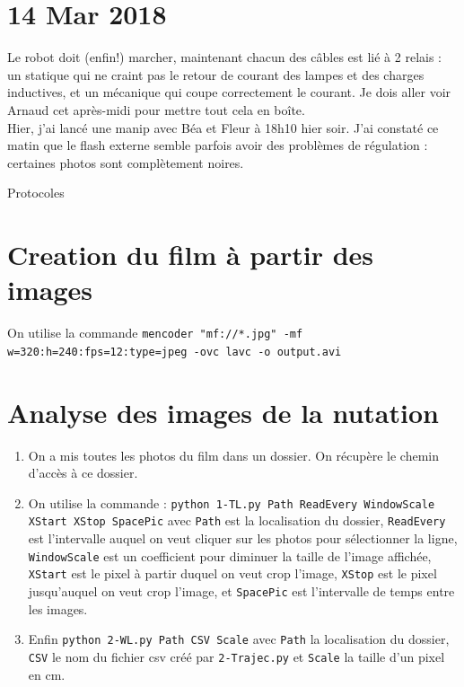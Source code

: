 \documentclass[10pt,a4paper]{article}
\begin{document}
\section{14 Mar 2018}
Le robot doit (enfin!) marcher, maintenant chacun des câbles est lié à 2 relais : un statique qui ne craint pas le retour de courant des lampes et des charges inductives, et un mécanique qui coupe correctement le courant. Je dois aller voir Arnaud cet après-midi pour mettre tout cela en boîte.\\

Hier, j'ai lancé une manip avec Béa et Fleur à 18h10 hier soir. J'ai constaté ce matin que le flash externe semble parfois avoir des problèmes de régulation : certaines photos sont complètement noires.


\newpage
\begin{center}
    {\Huge Protocoles}
\end{center}
\appendix
\setcounter{secnumdepth}{1}

\section{Creation du film à partir des images\label{film}}
On utilise la commande \texttt{mencoder "mf://*.jpg" -mf w=320:h=240:fps=12:type=jpeg -ovc lavc -o output.avi}


\section{Analyse des images de la nutation\label{anaNut}}
\begin{enumerate}
    \item On a mis toutes les photos du film dans un dossier. On récupère le chemin d'accès à ce dossier.
    \item On utilise la commande : \texttt{python 1-TL.py Path ReadEvery WindowScale XStart XStop SpacePic} avec \texttt{Path} est la localisation du dossier, \texttt{ReadEvery} est l'intervalle auquel on veut cliquer sur les photos pour sélectionner la ligne, \texttt{WindowScale} est un coefficient pour diminuer la taille de l'image affichée, \texttt{XStart} est le pixel à partir duquel on veut crop l'image, \texttt{XStop} est le pixel jusqu'auquel on veut crop l'image, et \texttt{SpacePic} est l'intervalle de temps entre les images.
    \item Enfin \texttt{python 2-WL.py Path CSV Scale} avec \texttt{Path} la localisation du dossier, \texttt{CSV} le nom du fichier csv créé par \texttt{2-Trajec.py} et \texttt{Scale} la taille d'un pixel en cm.
\end{enumerate}
\end{document}
